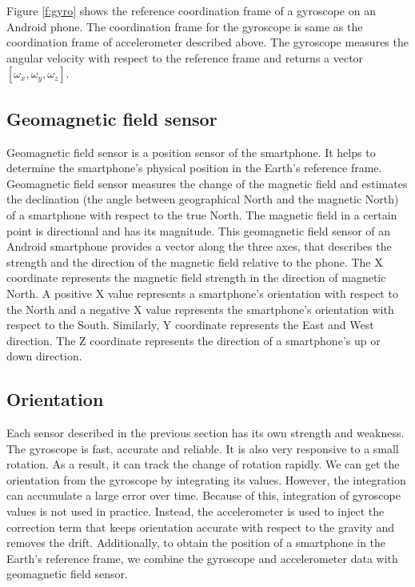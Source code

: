 Figure \ref{f:gyro} shows the reference coordination frame of a gyroscope on an Android phone.
The coordination frame for the gyroscope is same as the coordination frame of accelerometer described above.
The gyroscope measures the angular velocity with respect to the reference frame and returns a vector $[\omega_x, \omega_y, \omega_z]$.


\subsection{Geomagnetic field sensor}
Geomagnetic field sensor is a position sensor of the smartphone.
It helps to determine the smartphone's physical position in the Earth's reference frame.
Geomagnetic field sensor measures the change of the magnetic field and estimates the declination (the angle between geographical North and the magnetic North) of a smartphone with respect to the true North. 
The magnetic field in a certain point is directional and has its magnitude.
This geomagnetic field sensor of an Android smartphone provides a vector along the three axes, that describes the strength and the direction of the magnetic field relative to the phone.
The X coordinate represents the magnetic field strength in the direction of magnetic North.
A positive X value represents a smartphone's orientation with respect to the North and a negative X value represents the smartphone's orientation with respect to the South.
Similarly, Y coordinate represents the East and West direction.
The Z coordinate represents the direction of a smartphone's up or down direction.


\subsection{Orientation}
Each sensor described in the previous section has its own strength and weakness.
The gyroscope is fast, accurate and reliable.
It is also very responsive to a small rotation.
As a result, it can track the change of rotation rapidly.
We can get the orientation from the gyroscope by integrating its values.
However, the integration can accumulate a large error over time.
Because of this, integration of gyroscope values is not used in practice. 
Instead, the accelerometer is used to inject the correction term that keeps orientation accurate with respect to the gravity and removes the drift.
Additionally, to obtain the position of a smartphone in the Earth's reference frame, we combine the gyroscope and accelerometer data with geomagnetic field sensor.


